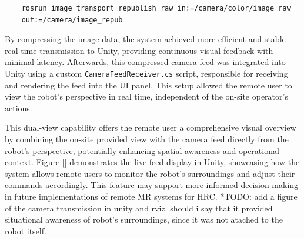 \begin{verbatim} 
    rosrun image_transport republish raw in:=/camera/color/image_raw 
    out:=/camera/image_repub 
\end{verbatim}

By compressing the image data, the system achieved more efficient and stable real-time transmission to Unity, providing continuous visual feedback with minimal latency. Afterwards, this compressed camera feed was integrated into Unity using a custom \texttt{CameraFeedReceiver.cs} script, responsible for receiving and rendering the feed into the \ac{UI} panel. This setup allowed the remote user to view the robot’s perspective in real time, independent of the on-site operator’s actions. 

This dual-view capability offers the remote user a comprehensive visual overview by combining the on-site provided view with the camera feed directly from the robot’s perspective, potentially enhancing spatial awareness and operational context. Figure \ref{} demonstrates the live feed display in Unity, showcasing how the system allows remote users to monitor the robot’s surroundings and adjust their commands accordingly. This feature may support more informed decision-making in future implementations of remote \ac{MR} systems for \ac{HRC}.
*TODO: add a figure of the camera transmission in unity and rviz. should i say that it provided situational awareness of robot's surroundings, since it was not atached to the robot itself. 







